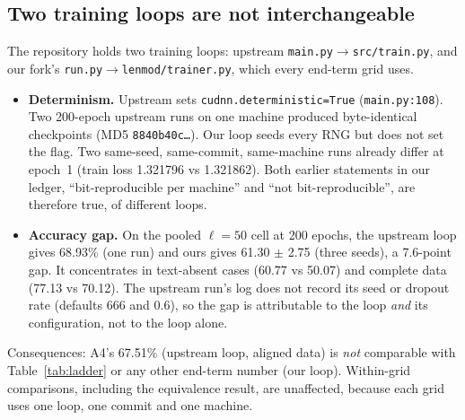 \documentclass[lettersize,journal]{IEEEtran}
\begin{document}
\subsection{Two training loops are not interchangeable}\label{sec:loops}
The repository holds two training loops: upstream \texttt{main.py}$\rightarrow$\texttt{src/train.py}, and our fork's \texttt{run.py}$\rightarrow$\texttt{lenmod/trainer.py}, which every end-term grid uses.
\begin{itemize}
\item \textbf{Determinism.} Upstream sets \texttt{cudnn.deterministic=True} (\texttt{main.py:108}). Two 200-epoch upstream runs on one machine produced byte-identical checkpoints (MD5 \texttt{8840b40c\ldots}). Our loop seeds every RNG but does not set the flag. Two same-seed, same-commit, same-machine runs already differ at epoch~1 (train loss 1.321796 vs 1.321862). Both earlier statements in our ledger, ``bit-reproducible per machine'' and ``not bit-reproducible'', are therefore true, of different loops.
\item \textbf{Accuracy gap.} On the pooled $\ell=50$ cell at 200 epochs, the upstream loop gives 68.93\% (one run) and ours gives 61.30 $\pm$ 2.75 (three seeds), a 7.6-point gap. It concentrates in text-absent cases (60.77 vs 50.07) and complete data (77.13 vs 70.12). The upstream run's log does not record its seed or dropout rate (defaults 666 and 0.6), so the gap is attributable to the loop \emph{and} its configuration, not to the loop alone.
\end{itemize}
Consequences: A4's 67.51\% (upstream loop, aligned data) is \emph{not} comparable with Table~\ref{tab:ladder} or any other end-term number (our loop). Within-grid comparisons, including the equivalence result, are unaffected, because each grid uses one loop, one commit and one machine.
\end{document}
